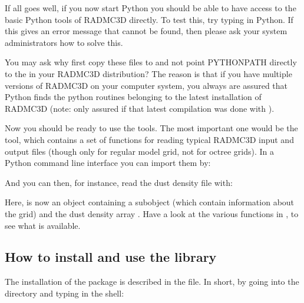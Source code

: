 \documentclass[letterpaper,10pt,english]{sphinxmanual}
\begin{document}
If all goes well, if you now start Python you should be able to have access to
the basic Python tools of RADMC\sphinxhyphen{}3D directly. To test this, try typing  in Python. If this gives an error message
that  cannot be found, then please ask your system
administrators how to solve this.

You may ask why first copy these files to 
and not point PYTHONPATH directly to the  in your RADMC\sphinxhyphen{}3D
distribution? The reason is that if you have multiple versions of RADMC\sphinxhyphen{}3D on
your computer system, you always are assured that Python finds the python
routines belonging to the latest installation of RADMC\sphinxhyphen{}3D (note: only assured if
that latest compilation was done with ).

Now you should be ready to use the tools. The most important one would be
the  tool, which contains a set of functions for
reading typical RADMC\sphinxhyphen{}3D input and output files (though only for regular
model grid, not for octree grids). In a Python command line interface
you can import them by:

\begin{sphinxVerbatim}[commandchars=\\\{\}]
   
\end{sphinxVerbatim}

And you can then, for instance, read the dust density file with:

\begin{sphinxVerbatim}[commandchars=\\\{\}]
  
\end{sphinxVerbatim}

Here,  is now an object containing a  subobject (which contain
information about the grid) and the dust density array . Have a
look at the various functions in , to see what is available.


\subsection{How to install and use the  library}
\label{\detokenize{installation:how-to-install-and-use-the-python-radmc3dpy-library}}
The installation of the  package is described in the
 file. In short, by going into the
 directory and typing in the shell:
\end{document}
